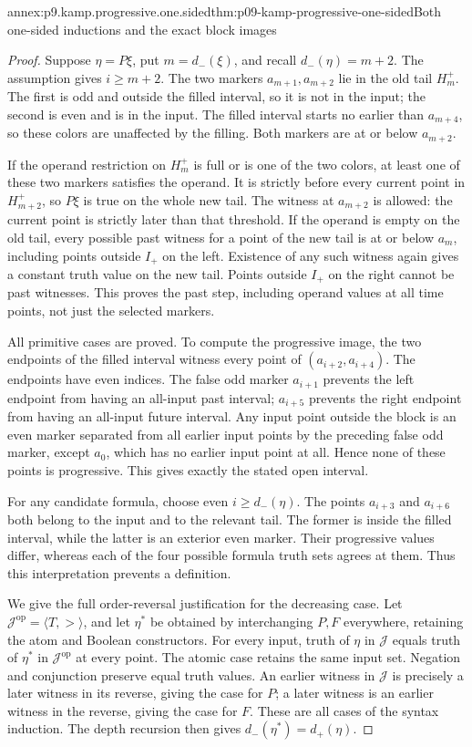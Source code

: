 \begin{annexitem}{annex:p9.kamp.progressive.one.sided}{thm:p09-kamp-progressive-one-sided}{Both one-sided inductions and the exact block images}
\begin{proof}
Suppose \(\eta=P\xi\), put
\(m=d_-(\xi)\), and recall
\(d_-(\eta)=m+2\). The assumption gives
\(i\geq m+2\). The two markers
\(a_{m+1},a_{m+2}\) lie in the old tail
\(H_m^+\). The first is odd and outside
the filled interval, so it is not in the
input; the second is even and is in the
input. The filled interval starts no earlier
than \(a_{m+4}\), so these colors are
unaffected by the filling. Both markers are
at or below \(a_{m+2}\).

If the operand restriction on \(H_m^+\)
is full or is one of the two colors, at
least one of these two markers satisfies
the operand. It is strictly before every
current point in \(H_{m+2}^+\), so
\(P\xi\) is true on the whole new tail.
The witness at \(a_{m+2}\) is allowed:
the current point is strictly later than
that threshold. If the operand is empty
on the old tail, every possible past
witness for a point of the new tail is
at or below \(a_m\), including points
outside \(I_+\) on the left. Existence
of any such witness again gives a constant
truth value on the new tail. Points outside
\(I_+\) on the right cannot be past
witnesses. This proves the past step,
including operand values at all time points,
not just the selected markers.

All primitive cases are proved. To compute
the progressive image, the two endpoints
of the filled interval witness every point
of \((a_{i+2},a_{i+4})\). The endpoints
have even indices. The false odd marker
\(a_{i+1}\) prevents the left endpoint
from having an all-input past interval;
\(a_{i+5}\) prevents the right endpoint
from having an all-input future interval.
Any input point outside the block is an
even marker separated from all earlier
input points by the preceding false odd
marker, except \(a_0\), which has no
earlier input point at all. Hence none
of these points is progressive. This
gives exactly the stated open interval.

For any candidate formula, choose even
\(i\geq d_-(\eta)\). The points
\(a_{i+3}\) and \(a_{i+6}\) both
belong to the input and to the relevant
tail. The former is inside the filled
interval, while the latter is an exterior
even marker. Their progressive values
differ, whereas each of the four possible
formula truth sets agrees at them. Thus
this interpretation prevents a definition.

We give the full order-reversal justification
for the decreasing case. Let
\(\mathcal J^{\mathrm{op}}=\langle T,>\rangle\),
and let \(\eta^*\) be obtained by interchanging
\(P,F\) everywhere, retaining the atom and
Boolean constructors. For every input, truth
of \(\eta\) in \(\mathcal J\) equals
truth of \(\eta^*\) in \(\mathcal J^{\mathrm{op}}\)
at every point. The atomic case retains the
same input set. Negation and conjunction
preserve equal truth values. An earlier
witness in \(\mathcal J\) is precisely
a later witness in its reverse, giving
the case for \(P\); a later witness is
an earlier witness in the reverse, giving
the case for \(F\). These are all cases
of the syntax induction. The depth recursion
then gives \(d_-(\eta^*)=d_+(\eta)\).


\end{proof}
\end{annexitem}
